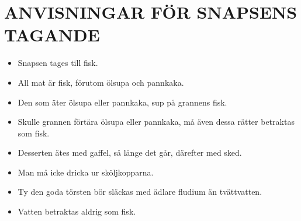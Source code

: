 \documentclass[a6paper,fontsize=10pt,twoside,open=right]{scrbook}
\begin{document}
\section{ANVISNINGAR FÖR SNAPSENS TAGANDE}
\vspace{10pt}
\begin{itemize}[leftmargin=0cm,topsep=0pt,itemsep=2pt,partopsep=0pt,parsep=3pt,label={}]
\item Snapsen tages till fisk.
\item All mat är fisk, förutom ölsupa och pannkaka.
\item Den som äter ölsupa eller pannkaka, sup på grannens fisk.
\item Skulle grannen förtära ölsupa eller pannkaka, må även dessa rätter betraktas som fisk.
\item Desserten ätes med gaffel, så länge det går, därefter med sked.
\item Man må icke dricka ur sköljkopparna.
\item Ty den goda törsten bör släckas med ädlare fludium än tvättvatten.
\item Vatten betraktas aldrig som fisk.
\end{itemize}
\newpage

\vspace{15pt}

\vspace{15pt}

\newpage

\vspace{15pt}

\newpage

\newpage

\vspace{15pt}

\newpage

\vspace{15pt}

\newpage

\vspace{15pt}

\newpage

\newpage

\vspace{15pt}

\newpage

\vspace{15pt}

\vspace{15pt}

\vspace{15pt}

\newpage

\vspace{15pt}
\end{document}
